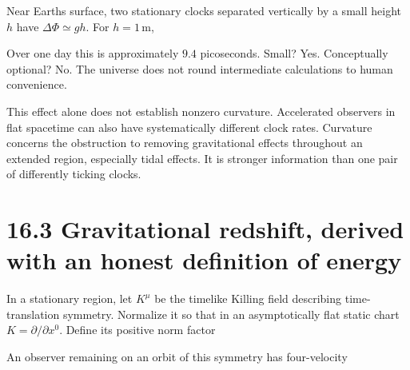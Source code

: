 \documentclass[
  11pt,
  letterpaper,
  oneside,
  openany]{scrbook}
\begin{document}
Near Earth\textquotesingle s surface, two stationary clocks separated
vertically by a small height \(h\) have \(\Delta\Phi\simeq gh\). For
\(h=1\,\mathrm m\),

\begin{center}
\begingroup
{}
\ifdim\wd\grmathbox>\linewidth
\resizebox{\linewidth}{!}{\usebox{\grmathbox}}
\else\usebox{\grmathbox}\fi
\endgroup
\end{center}

Over one day this is approximately \(9.4\) picoseconds. Small? Yes.
Conceptually optional? No. The universe does not round intermediate
calculations to human convenience.

This effect alone does not establish nonzero curvature. Accelerated
observers in flat spacetime can also have systematically different clock
rates. Curvature concerns the obstruction to removing gravitational
effects throughout an extended region, especially tidal effects. It is
stronger information than one pair of differently ticking clocks.

\hypertarget{gravitational-redshift-derived-with-an-honest-definition-of-energy}{%
\section{16.3 Gravitational redshift, derived with an honest definition
of
energy}\label{gravitational-redshift-derived-with-an-honest-definition-of-energy}}

In a stationary region, let \(K^\mu\) be the timelike Killing field
describing time-translation symmetry. Normalize it so that in an
asymptotically flat static chart \(K=\partial/\partial x^0\). Define its
positive norm factor

\begin{center}
\begingroup
{}
\ifdim\wd\grmathbox>\linewidth
\resizebox{\linewidth}{!}{\usebox{\grmathbox}}
\else\usebox{\grmathbox}\fi
\endgroup
\end{center}

An observer remaining on an orbit of this symmetry has four-velocity

\begin{center}
\begingroup
{}
\ifdim\wd\grmathbox>\linewidth
\resizebox{\linewidth}{!}{\usebox{\grmathbox}}
\else\usebox{\grmathbox}\fi
\endgroup
\end{center}
\end{document}
